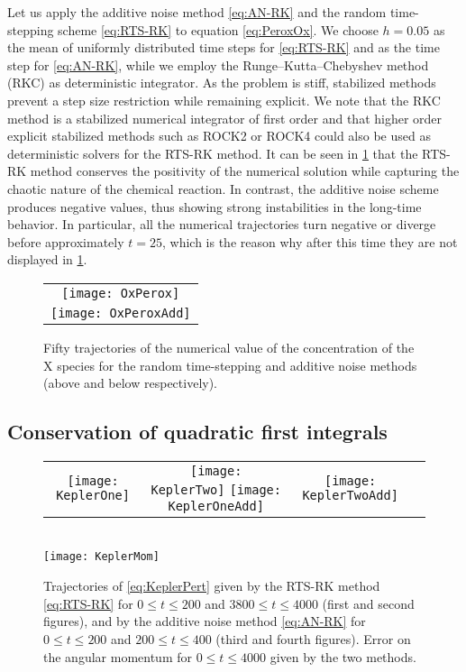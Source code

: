 \documentclass[10pt]{article}
\begin{document}
Let us apply the additive noise method \eqref{eq:AN-RK} and the random time-stepping scheme \eqref{eq:RTS-RK} to equation \eqref{eq:PeroxOx}. We choose $h = 0.05$ as the mean of uniformly distributed time steps for \eqref{eq:RTS-RK} and as the time step for \eqref{eq:AN-RK}, while we employ the Runge--Kutta--Chebyshev method (RKC) \cite{HoS80} as deterministic integrator.  As the problem is stiff, stabilized methods prevent a step size restriction while remaining explicit. We note that the RKC method is a stabilized numerical integrator of first order and that higher order explicit stabilized methods such as ROCK2 or ROCK4 \cite{AbM01, Abd02} could also be used as deterministic solvers for the RTS-RK method. It can be seen in \cref{fig:OxPeroxTraj} that the RTS-RK method conserves the positivity of the numerical solution while capturing the chaotic nature of the chemical reaction. In contrast, the additive noise scheme produces negative values, thus showing strong instabilities in the long-time behavior. In particular, all the numerical trajectories turn negative or diverge before approximately $t = 25$, which is the reason why after this time they are not displayed in \cref{fig:OxPeroxTraj}.
\begin{figure}
	\begin{center} 
		\begin{tabular}{c}
			\texttt{[image: OxPerox]}\\[10pt]
			\texttt{[image: OxPeroxAdd]}
		\end{tabular}
	\end{center}
	\caption{Fifty trajectories of the numerical value of the concentration of the $\mathrm X$ species for the random time-stepping and additive noise methods (above and below respectively).}
	\label{fig:OxPeroxTraj}
\end{figure}

\subsection{Conservation of quadratic first integrals} 

\begin{figure}[t]
	\begin{center}
		\begin{tabular}{cccc}
			\texttt{[image: KeplerOne]} & \texttt{[image: KeplerTwo]} \texttt{[image: KeplerOneAdd]} & \texttt{[image: KeplerTwoAdd]} \\
		\end{tabular}\\
	\vspace{0.4cm}
	\texttt{[image: KeplerMom]}
	\end{center}
	\caption{Trajectories of \eqref{eq:KeplerPert} given by the RTS-RK method \eqref{eq:RTS-RK} for $0 \leq t \leq 200$ and $3800 \leq t \leq 4000$ (first and second figures), and by the additive noise method \eqref{eq:AN-RK} for $0 \leq t \leq 200$ and $200 \leq t \leq 400$ (third and fourth figures). Error on the angular momentum  for $0 \leq t \leq 4000$ given by the two methods.}
	\label{fig:Kepler}
\end{figure}
\end{document}
